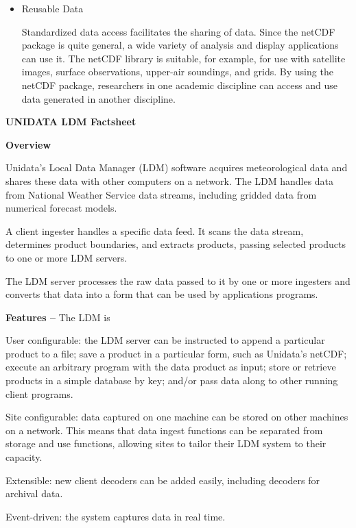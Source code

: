 \begin{itemize}
\begin{itemize}
	\item Reusable Data

\noindent Standardized data access facilitates the sharing of data.  Since the 
netCDF package is quite general, a wide variety of analysis and display 
applications can use it.  The netCDF library is suitable, for example, for 
use with satellite images, surface observations, upper-air soundings, and 
grids.  By using the netCDF package, researchers in one academic 
discipline can access and use data generated in another discipline.
    \end{itemize}
\end{itemize}

\large
\begin{description}
\item{\bf *} {\bf UNIDATA LDM Factsheet}
\end{description}
\normalsize


\begin{description}
	\item {}{\bf Overview}

\noindent Unidata's Local Data Manager (LDM) software acquires 
meteorological data and shares these data with other computers on a 
network.  The LDM handles data from National Weather Service data 
streams, including gridded data from numerical forecast models.

\noindent A client ingester handles a specific data feed.  It scans the data 
stream, determines product boundaries, and extracts products, passing 
selected products to one or more LDM servers.

\noindent The LDM server processes the raw data passed to it by one or more 
ingesters and converts that data into a form that can be used by 
applications programs.

	\item {} {\bf Features --}  The LDM is

\noindent User configurable:  the LDM server can be instructed to append a 
particular product to a file; save a product in a particular form, such as 
Unidata's netCDF; execute an arbitrary program with the data product as 
input; store or retrieve products in a simple database by key; and/or pass 
data along to other running client programs.

\noindent Site configurable:  data captured on one machine can be stored on 
other machines on a network. This means that data ingest functions can be 
separated from storage and use functions, allowing sites to tailor their 
LDM system to their capacity.

\noindent Extensible:  new client decoders can be added easily, including 
decoders for archival data.

\noindent Event-driven:  the system captures data in real time.
\end{description}

